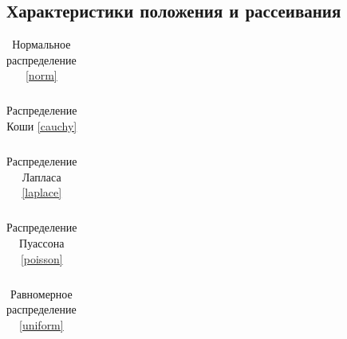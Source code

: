 \documentclass[a4paper]{article}
\begin{document}
\subsection{Характеристики положения и рассеивания}
\begin{table}[H]
    \centering
    \begin{tabular}{|c|C{2cm}|C{2cm}|C{2cm}|C{2cm}|C{2cm}|}
        \hline
        
    \end{tabular}
    \caption{Нормальное распределение \eqref{norm}}
    \label{tab:norm}
\end{table}
\begin{table}[H]
    \centering
    \begin{tabular}{|c|C{2cm}|C{2cm}|C{3cm}|C{2cm}|C{2cm}|}
        \hline
        
    \end{tabular}
    \caption{Распределение Коши \eqref{cauchy}}
    \label{tab:cauchy}
\end{table}
\begin{table}[H]
    \centering
    \begin{tabular}{|c|C{2cm}|C{2cm}|C{2cm}|C{2cm}|C{2cm}|}
        \hline
        
    \end{tabular}
    \caption{Распределение Лапласа \eqref{laplace}}
    \label{tab:laplace}
\end{table}
\begin{table}[H]
    \centering
    \begin{tabular}{|c|C{2cm}|C{2cm}|C{2cm}|C{2cm}|C{2cm}|}
        \hline
        
    \end{tabular}
    \caption{Распределение Пуассона \eqref{poisson}}
    \label{tab:poisson}
\end{table}
\begin{table}[H]
    \centering
    \begin{tabular}{|c|C{2cm}|C{2cm}|C{2cm}|C{2cm}|C{2cm}|}
        \hline
        
    \end{tabular}
    \caption{Равномерное распределение \eqref{uniform}}
    \label{tab:uniform}
\end{table}
\end{document}
